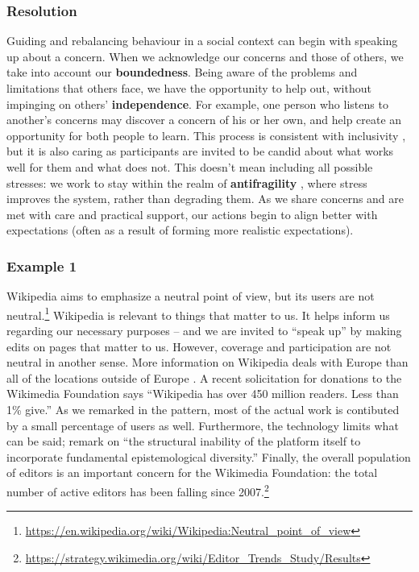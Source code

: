 \subsubsection*{Resolution}

Guiding and rebalancing behaviour in a social context can begin with speaking up about a concern.  When we acknowledge our concerns and those of others, we take into account our \textbf{boundedness}.  Being aware of the problems and limitations that others face, we have the opportunity to help out, without impinging on others' \textbf{independence}.  For example, one person who listens to another's concerns may discover a concern of his or her own, and help create an opportunity for both people to learn.  This process is  consistent with inclusivity \cite{garrison2013toward}, but it is also caring as participants are invited to be candid about what works well for them and what does not.  This doesn't mean including all possible stresses: we work to stay within the realm of \textbf{antifragility} \cite{taleb2012antifragile}, where stress improves the system, rather than degrading them. 
%
As we share concerns and are met with care and practical support, our actions begin to align better with expectations (often as a result of forming more realistic expectations). 

\subsubsection*{Example 1}
Wikipedia aims to emphasize a neutral point of view, but its users are
not neutral.\footnote{\url{https://en.wikipedia.org/wiki/Wikipedia:Neutral_point_of_view}}
Wikipedia is relevant to things that matter to us.  It
helps inform us regarding our necessary purposes -- and we are invited
to ``speak up'' by making edits on pages that matter to us.  However,
coverage and participation are not neutral in another sense.
More information on Wikipedia deals with Europe than
all of the locations outside of Europe \citep{graham2014uneven}.
A recent solicitation for donations to the Wikimedia Foundation
says ``Wikipedia has over 450 million readers.  Less than 1\% give.''
%
As we remarked in the  pattern, most of the
actual work is contibuted by a small percentage of users as well.
%
Furthermore, the technology limits what can be said; 
\cite{graham2014uneven} remark on
``the structural inability of the platform itself to incorporate fundamental epistemological diversity.''
%
Finally, the overall population of editors is an important concern for
the Wikimedia Foundation: the total number of active editors has been
falling since
2007.\footnote{\url{https://strategy.wikimedia.org/wiki/Editor_Trends_Study/Results}}

